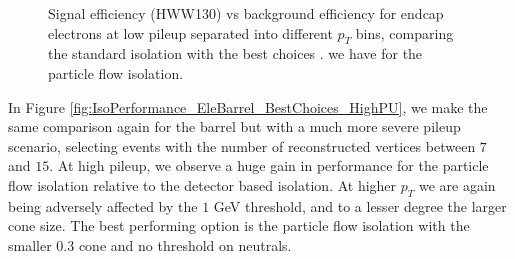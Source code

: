 \begin{figure}[!htbp]
\begin{center}
\caption{Signal efficiency (HWW130) vs background efficiency for endcap electrons at low pileup
separated into different $p_{T}$ bins, comparing the standard isolation with the best choices .
we have for the particle flow isolation.}
\label{fig:IsoPerformance_EleEndcap_BestChoices_LowPU}
\end{center}
\end{figure}

\clearpage

In Figure \ref{fig:IsoPerformance_EleBarrel_BestChoices_HighPU}, we make the same comparison again for the
barrel but with a much more severe pileup scenario, selecting events with the number of reconstructed
vertices between $7$ and $15$. At high pileup, we observe a huge gain in performance for the particle
flow isolation relative to the detector based isolation. At higher $p_{T}$ we are again being 
adversely affected by the $1$ GeV threshold, and to a lesser degree the larger cone size. The
best performing option is the particle flow isolation with the smaller $0.3$ cone and no threshold
on neutrals.




